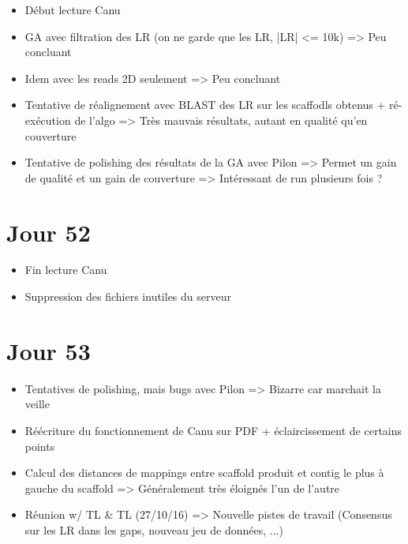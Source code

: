 \documentclass[12pt]{report}
\begin{document}
\begin{itemize}
	\item Début lecture Canu
	
	\item GA avec filtration des LR (on ne garde que les LR, |LR| <= 10k) => Peu concluant
	
	\item Idem avec les reads 2D seulement => Peu concluant
	
	\item Tentative de réalignement avec BLAST des LR sur les scaffodls obtenus + ré-exécution de l'algo => Très mauvais résultats, autant
	en qualité qu'en couverture
	
	\item Tentative de polishing des résultats de la GA avec Pilon => Permet un gain de qualité et un gain de couverture 
	=> Intéressant de run plusieurs fois ?
\end{itemize}

\section{Jour 52}

\begin{itemize}
	\item Fin lecture Canu 
	
	\item Suppression des fichiers inutiles du serveur
\end{itemize}

\section{Jour 53}

\begin{itemize}
	\item Tentatives de polishing, mais bugs avec Pilon => Bizarre car marchait la veille
	
	\item Réécriture du fonctionnement de Canu sur PDF + éclaircissement de certains points
	
	\item Calcul des distances de mappings entre scaffold produit et contig le plus à gauche du scaffold => Généralement très éloignés l'un de l'autre
	
	\item Réunion w/ TL \& TL (27/10/16) => Nouvelle pistes de travail (Consensus sur les LR dans les gaps, nouveau jeu de données, ...)
\end{itemize}
\end{document}
